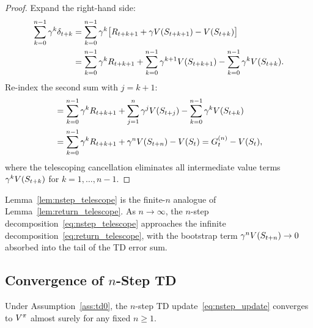 \documentclass[11pt,a4paper]{article}
\begin{document}
\begin{proof}
Expand the right-hand side:
\begin{align}
  \sum_{k=0}^{n-1} \gamma^k \delta_{t+k}
  &= \sum_{k=0}^{n-1} \gamma^k
     \bigl[R_{t+k+1} + \gamma V(S_{t+k+1}) - V(S_{t+k})\bigr]
     \nonumber\\
  &= \sum_{k=0}^{n-1} \gamma^k R_{t+k+1}
     + \sum_{k=0}^{n-1} \gamma^{k+1} V(S_{t+k+1})
     - \sum_{k=0}^{n-1} \gamma^k V(S_{t+k}).
     \label{eq:nstep_expand}
\end{align}
Re-index the second sum with $j = k + 1$:
\begin{align}
  &= \sum_{k=0}^{n-1} \gamma^k R_{t+k+1}
     + \sum_{j=1}^{n} \gamma^j V(S_{t+j})
     - \sum_{k=0}^{n-1} \gamma^k V(S_{t+k}) \nonumber\\
  &= \sum_{k=0}^{n-1} \gamma^k R_{t+k+1}
     + \gamma^n V(S_{t+n}) - V(S_t)
   = G_t^{(n)} - V(S_t),
  \label{eq:nstep_telescope_final}
\end{align}
where the telescoping cancellation eliminates all intermediate value
terms $\gamma^k V(S_{t+k})$ for $k = 1, \ldots, n-1$.
\end{proof}

\begin{remark}
\label{rem:nstep_infinite}
Lemma~\ref{lem:nstep_telescope} is the finite-$n$ analogue of
Lemma~\ref{lem:return_telescope}. As $n \to \infty$, the $n$-step
decomposition~\eqref{eq:nstep_telescope} approaches the infinite
decomposition~\eqref{eq:return_telescope}, with the bootstrap term
$\gamma^n V(S_{t+n}) \to 0$ absorbed into the tail of the TD error
sum.
\end{remark}

\subsection{Convergence of $n$-Step TD}
\label{subsec:nstep_convergence}

\begin{theorem}
\label{thm:nstep_convergence}
Under Assumption~\ref{ass:td0}, the $n$-step TD
update~\eqref{eq:nstep_update} converges to $V^{\pi}$ almost surely
for any fixed $n \geq 1$.
\end{theorem}
\end{document}
